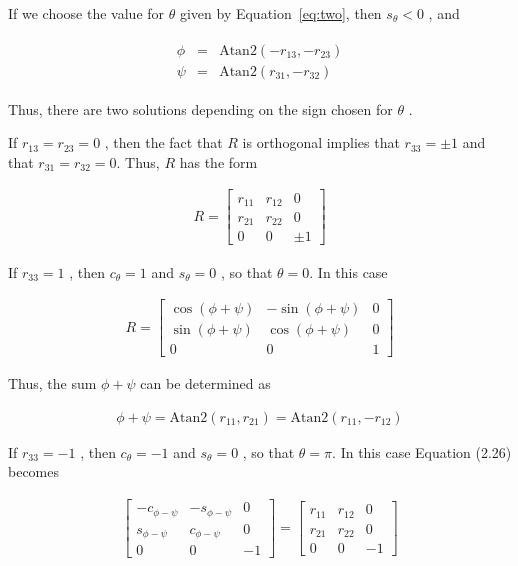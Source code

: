 \documentclass[12pt, a4paper]{article}
\begin{document}
If we choose the value for \(\theta\) given by Equation~\ref{eq:two}, then \(s_{\theta} < 0\) , and

\begin{align}
\begin{array}{rcl}
\phi & = & \mathrm{Atan2}(-r_{13}, -r_{23}) \\
\psi & = & \mathrm{Atan2}(r_{31}, -r_{32})
\end{array}
\end{align}

Thus, there are two solutions depending on the sign chosen for \(\theta\) .

If \(r_{13} = r_{23} = 0\) , then the fact that \(R\) is orthogonal implies that \(r_{33} = \pm 1\) and that \(r_{31} = r_{32} = 0\). Thus, \(R\) has the form

\begin{align}
R = \begin{bmatrix}
r_{11} & r_{12} & 0 \\
r_{21} & r_{22} & 0 \\
0 & 0 & \pm 1
\end{bmatrix}
\end{align}

If \(r_{33} = 1\) , then \(c_{\theta} = 1\) and \(s_{\theta} = 0\) , so that \(\theta = 0\). In this case

\begin{align}
R = 
\begin{bmatrix}
\cos(\phi+\psi) & -\sin(\phi+\psi) & 0 \\
\sin(\phi+\psi) & \cos(\phi+\psi) & 0 \\
0 & 0 & 1
\end{bmatrix}
\end{align}

Thus, the sum \(\phi + \psi\) can be determined as

\begin{align}
\phi + \psi = \mathrm{Atan2}(r_{11}, r_{21}) = \mathrm{Atan2}(r_{11}, -r_{12}) 
\end{align}

If \(r_{33} = -1\) , then \(c_{\theta} = -1\) and \(s_{\theta} = 0\) , so that \(\theta = \pi\). In this case Equation (2.26) becomes

\begin{align}
\begin{bmatrix}
-c_{\phi-\psi} & -s_{\phi-\psi} & 0 \\[4pt]
s_{\phi-\psi} & c_{\phi-\psi} & 0 \\[4pt]
0 & 0 & -1
\end{bmatrix}
=
\begin{bmatrix}
r_{11} & r_{12} & 0 \\
r_{21} & r_{22} & 0 \\
0 & 0 & -1
\end{bmatrix} 
\end{align}
\end{document}
